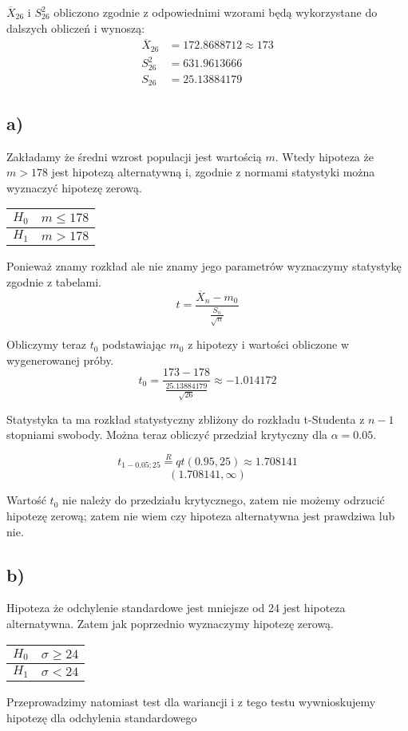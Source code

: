 \documentclass{article}
\begin{document}
$\overline{X}_{26}$ i $S_{26}^2$ obliczono zgodnie z odpowiednimi wzorami będą wykorzystane do dalszych obliczeń i wynoszą:
\begin{align*}
\overline{X}_{26} & = 172.8688712 \approx 173 \\
S_{26}^2 & = 631.9613666 \\
S_{26} & = 25.13884179
\end{align*}

\subsection{a)}
Zakładamy że średni wzrost populacji jest wartością $m$. Wtedy hipoteza że $m > 178$ jest hipotezą alternatywną i, zgodnie z normami statystyki można wyznaczyć hipotezę zerową.
\begin{center} \begin{tabular}{|c|c|} \hline
$H_0$ & $m \leq 178$ \\ \hline
$H_1$ & $m > 178$ \\ \hline
\end{tabular} \end{center}

Ponieważ znamy rozkład ale nie znamy jego parametrów wyznaczymy statystykę zgodnie z tabelami.
\[ t = \frac{\overline{X}_n - m_0}{\frac{S_n}{\sqrt{n}}} \]

Obliczymy teraz $t_0$ podstawiając $m_0$ z hipotezy i wartości obliczone w wygenerowanej próby.
\[ t_0 = \frac{173 - 178}{\frac{25.13884179}{\sqrt{26}}} \approx -1.014172 \]

Statystyka ta ma rozkład statystyczny zbliżony do rozkładu t-Studenta z $n-1$ stopniami swobody. Można teraz obliczyć przedział krytyczny dla $\alpha = 0.05$.

\[ t_{1-0.05;25} \overset{R}{=} qt(0.95, 25) \approx 1.708141 \]
\[ ( 1.708141, \infty) \]

Wartość $t_0$ nie należy do przedziału krytycznego, zatem nie możemy odrzucić hipotezę zerową; zatem nie wiem czy hipoteza alternatywna jest prawdziwa lub nie.

\subsection{b)}
Hipoteza że odchylenie standardowe jest mniejsze od 24 jest hipoteza alternatywna. Zatem jak poprzednio wyznaczymy hipotezę zerową.
\begin{center} \begin{tabular}{|c|c|} \hline
$H_0$ & $\sigma \geq 24$ \\ \hline
$H_1$ & $\sigma < 24$ \\ \hline
\end{tabular} \end{center}
Przeprowadzimy natomiast test dla wariancji i z tego testu wywnioskujemy hipotezę dla odchylenia standardowego \\ \par
\end{document}
